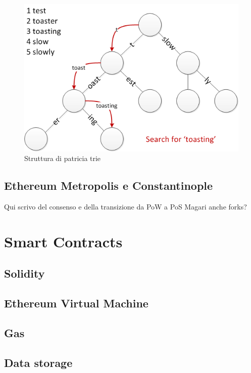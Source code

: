 \begin{figure}[H]
\centering
\includegraphics[width=1\textwidth]{immagini/patricia_trie.png}
\caption{Struttura di patricia trie}
\label{fig:mesh6}
\end{figure}

\subsection{Ethereum Metropolis e Constantinople}

Qui scrivo del consenso e della transizione da PoW a PoS
Magari anche forks?

\section{Smart Contracts}


\subsection{Solidity}

\subsection{Ethereum Virtual Machine}

\blindtext

\subsection{Gas}

\subsection{Data storage}
